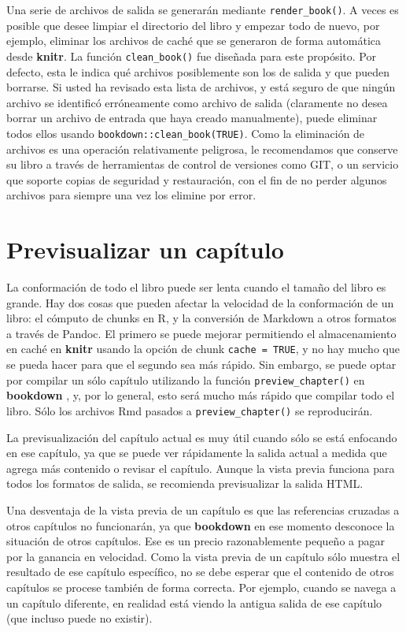 \documentclass[12pt,]{krantz}
\theoremstyle{definition}
\theoremstyle{definition}
\theoremstyle{definition}
\theoremstyle{remark}
\begin{document}
Una serie de archivos de salida se generarán mediante
\texttt{render\_book()}. A veces es posible que desee limpiar el
directorio del libro y empezar todo de nuevo, por ejemplo, eliminar los
archivos de caché que se generaron de forma automática desde
\textbf{knitr}. La función \texttt{clean\_book()} fue diseñada para este
propósito. Por defecto, esta le indica qué archivos posiblemente son los
de salida y que pueden borrarse. Si usted ha revisado esta lista de
archivos, y está seguro de que ningún archivo se identificó erróneamente
como archivo de salida (claramente no desea borrar un archivo de entrada
que haya creado manualmente), puede eliminar todos ellos usando
\texttt{bookdown::clean\_book(TRUE)}. Como la eliminación de archivos es
una operación relativamente peligrosa, le recomendamos que conserve su
libro a través de herramientas de control de versiones como GIT, o un
servicio que soporte copias de seguridad y restauración, con el fin de
no perder algunos archivos para siempre una vez los elimine por error.

\section{Previsualizar un capítulo}\label{previsualizar-un-capitulo}

La conformación de todo el libro puede ser lenta cuando el tamaño del
libro es grande. Hay dos cosas que pueden afectar la velocidad de la
conformación de un libro: el cómputo de chunks en R, y la conversión de
Markdown a otros formatos a través de Pandoc. El primero se puede
mejorar permitiendo el almacenamiento en caché en \textbf{knitr} usando
la opción de chunk \texttt{cache\ =\ TRUE}, y no hay mucho que se pueda
hacer para que el segundo sea más rápido. Sin embargo, se puede optar
por compilar un sólo capítulo utilizando la función
\texttt{preview\_chapter()} en \textbf{bookdown} , y, por lo general,
esto será mucho más rápido que compilar todo el libro. Sólo los archivos
Rmd pasados a \texttt{preview\_chapter()} se reproducirán.

La previsualización del capítulo actual es muy útil cuando sólo se está
enfocando en ese capítulo, ya que se puede ver rápidamente la salida
actual a medida que agrega más contenido o revisar el capítulo. Aunque
la vista previa funciona para todos los formatos de salida, se
recomienda previsualizar la salida HTML.

Una desventaja de la vista previa de un capítulo es que las referencias
cruzadas a otros capítulos no funcionarán, ya que \textbf{bookdown} en
ese momento desconoce la situación de otros capítulos. Ese es un precio
razonablemente pequeño a pagar por la ganancia en velocidad. Como la
vista previa de un capítulo sólo muestra el resultado de ese capítulo
específico, no se debe esperar que el contenido de otros capítulos se
procese también de forma correcta. Por ejemplo, cuando se navega a un
capítulo diferente, en realidad está viendo la antigua salida de ese
capítulo (que incluso puede no existir).
\end{document}
